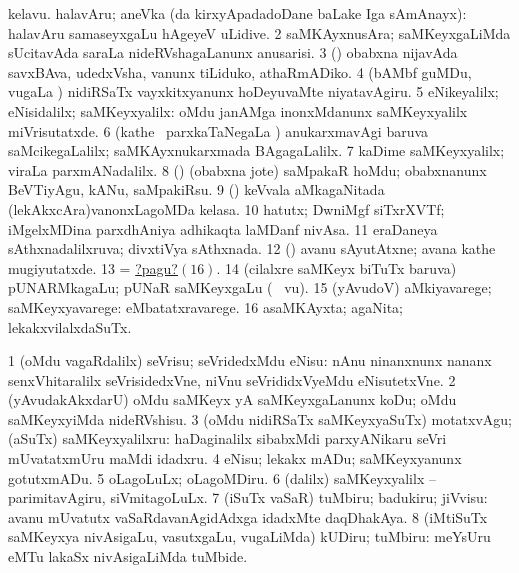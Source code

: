 \noindent
\gl{\pagu}
\bmng
\bnum
{}  
\banum
{} kelavu. 
 halavAru; aneVka (\bava da kirxyApadadoDane baLake Iga sAmAnayx):  halavAru samaseyxgaLu hAgeyeV uLidive. 
\eanum
\numie
\num{2}  saMKAyxnusAra; saMKeyxgaLiMda sUcitavAda saraLa nideRVshagaLanunx anusarisi. 
\num{3} (\ashi) obabxna nijavAda savxBAva, udedxVsha, \mo vanunx tiLiduko, athaRmADiko. 
\num{4} (bAMbf guMDu, \mo vugaLa \vi) nidiRSaTx vayxkitxyanunx hoDeyuvaMte niyatavAgiru. 
\num{5}  eNikeyalilx; eNisidalilx; saMKeyxyalilx:  oMdu janAMga inonxMdanunx saMKeyxyalilx miVrisutatxde. 
\num{6} (kathe \mo\ parxkaTaNegaLa \vi) anukarxmavAgi baruva saMcikegaLalilx; saMKAyxnukarxmada BAgagaLalilx. 
\num{7}  kaDime saMKeyxyalilx; viraLa parxmANadalilx. 
\num{8} (\ashi) (obabxna jote) saMpakaR hoMdu; obabxnanunx BeVTiyAgu, kANu, saMpakiRsu. 
\num{9}  (\hiV) keVvala aMkagaNitada (lekAkxcAra)vanonxLagoMDa kelasa. 
\num{10}  hatutx; DwniMgf siTxrXVTf; iMgelxMDina parxdhAniya adhikaqta laMDanf nivAsa. 
\num{11}  eraDaneya sAthxnadalilxruva; divxtiVya sAthxnada. 
\num{12} (\AmA) avanu sAyutAtxne; avana kathe mugiyutatxde. 
\num{13}  = \hyperlink{numberpagu16}{?pagu?\((16)\)}. 
\num{14}  (cilalxre saMKeyx biTuTx baruva) pUNARMkagaLu; pUNaR saMKeyxgaLu (\udA\  \mo vu). 
\num{15} (yAvudoV) aMkiyavarege; saMKeyxyavarege:  eMbatatxravarege. 
\hypertarget{numberpagu16}{} 
\num{16}  asaMKAyxta; agaNita; lekakxvilalxdaSuTx. 
\enum
\emng
\eentry

\bentry
{}
\gl{\sakirx}
\bmng
\bnum
\num{1} (oMdu vagaRdalilx) seVrisu; seVridedxMdu eNisu:  nAnu ninanxnunx nananx senxVhitaralilx seVrisidedxVne, niVnu seVrididxVyeMdu eNisutetxVne. 
\num{2} (yAvudakAkxdarU) oMdu saMKeyx yA saMKeyxgaLanunx koDu; oMdu saMKeyxyiMda nideRVshisu. 
\num{3} (oMdu nidiRSaTx saMKeyxyaSuTx) motatxvAgu; (aSuTx) saMKeyxyalilxru:  haDaginalilx sibabxMdi parxyANikaru seVri mUvatatxmUru maMdi idadxru. 
\num{4} eNisu; lekakx mADu; saMKeyxyanunx gotutxmADu. 
\num{5} oLagoLuLx; oLagoMDiru. 
\num{6} (\kaparx dalilx) saMKeyxyalilx -- parimitavAgiru, siVmitagoLuLx. 
\num{7} (iSuTx vaSaR) tuMbiru; badukiru; jiVvisu:  avanu mUvatutx vaSaRdavanAgidAdxga idadxMte daqDhakAya. 
\num{8} (iMtiSuTx saMKeyxya nivAsigaLu, vasutxgaLu, \mo vugaLiMda) kUDiru; tuMbiru:  meYsUru eMTu lakaSx nivAsigaLiMda tuMbide. 
\enum
\emng

